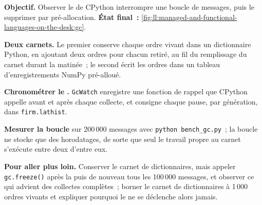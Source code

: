 \begin{tutorial}
\textbf{Objectif.} Observer le  de CPython interrompre une boucle de messages, puis le supprimer par pré-allocation. \textbf{État final~:}
\cref{fig:ll:managed-and-functional-languages-on-the-desk:gc}.
\begin{tutsteps}
\item \textbf{Deux carnets.} Le premier conserve chaque ordre vivant dans un dictionnaire Python, en ajoutant deux ordres pour chacun retiré, au fil du remplissage du carnet durant la matinée~; 
le second écrit les ordres dans un tableau d'enregistrements NumPy pré-alloué.
\label{lst:ll:managed-and-functional-languages-on-the-desk:books}
\item \textbf{Chronométrer le .} \texttt{GcWatch} enregistre une fonction de rappel que CPython appelle avant et après chaque
collecte, et consigne chaque pause, par génération, dans \texttt{firm.lathist}.
\label{lst:ll:managed-and-functional-languages-on-the-desk:watch}
\item \textbf{Mesurer la boucle} sur 200\,000 messages avec \texttt{python bench\_gc.py}~; la boucle ne stocke que des horodatages,
de sorte que seul le travail propre au carnet s'exécute entre deux d'entre eux.
\end{tutsteps}
\textbf{Pour aller plus loin.} Conserver le carnet de dictionnaires, mais appeler \texttt{gc.freeze()} après la  puis de nouveau
tous les 100\,000 messages, et observer ce qui advient des collectes complètes~; borner le carnet de dictionnaires à 1\,000 ordres vivants et
expliquer pourquoi le  ne se déclenche alors jamais.
\end{tutorial}


